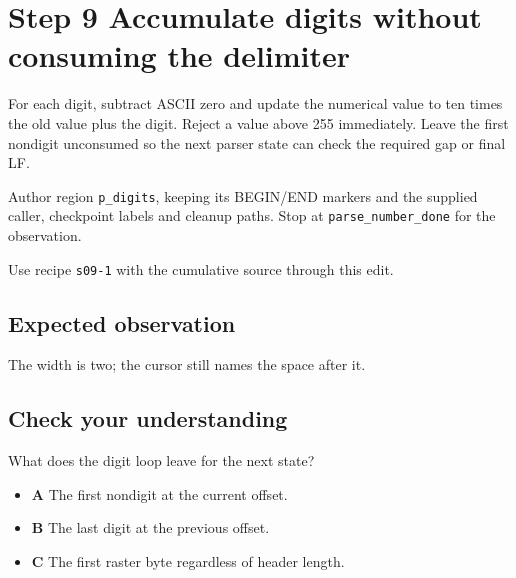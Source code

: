 \section{Step 9 Accumulate digits without consuming the delimiter}\label{ppm-s09}

For each digit, subtract ASCII zero and update the numerical value to ten times the old value plus the digit. Reject a value above 255 immediately. Leave the first nondigit unconsumed so the next parser state can check the required gap or final LF.

Author region \texttt{p\_digits}, keeping its BEGIN/END markers and the supplied caller, checkpoint labels and cleanup paths. Stop at \texttt{parse\_number\_done} for the observation.

Use recipe \texttt{s09-1} with the cumulative source through this edit.

\subsection{Expected observation}
The width is two; the cursor still names the space after it.

\subsection{Check your understanding}
What does the digit loop leave for the next state?

\begin{itemize}
\item \textbf{A} The first nondigit at the current offset.
\item \textbf{B} The last digit at the previous offset.
\item \textbf{C} The first raster byte regardless of header length.
\end{itemize}
